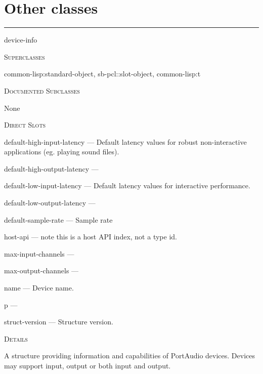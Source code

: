 \documentclass[a4paper]{report}
\begin{document}
  
      \section{Other classes}
      

    \rule{\linewidth}{0.1mm}
    
    \label{portaudio__class__device-info}
    \begin{defun}[Class]
    device-info


      
    \bigskip
    \textsc{Superclasses}

\color[rgb]{0.5,0.5,0.5}common-lisp:standard-object\color[rgb]{0,0,0}, \color[rgb]{0.5,0.5,0.5}sb-pcl::slot-object\color[rgb]{0,0,0}, \color[rgb]{0.5,0.5,0.5}common-lisp:t\color[rgb]{0,0,0}


      
    \bigskip
    \textsc{Documented Subclasses}


	    None
	  


	
    \bigskip
    \textsc{Direct Slots}

default-high-input-latency --- Default latency values for robust non-interactive applications (eg. playing sound files).

default-high-output-latency --- 

default-low-input-latency --- Default latency values for interactive performance.

default-low-output-latency --- 

default-sample-rate --- Sample rate

host-api --- note this is a host API index, not a type id.

max-input-channels --- 

max-output-channels --- 

name --- Device name.

p --- 

struct-version --- Structure version.




	
    \bigskip
    \textsc{Details}

A structure providing information and capabilities of PortAudio devices. Devices may support input, output or both input and output.


    
    \end{defun}
  
  
\end{document}
